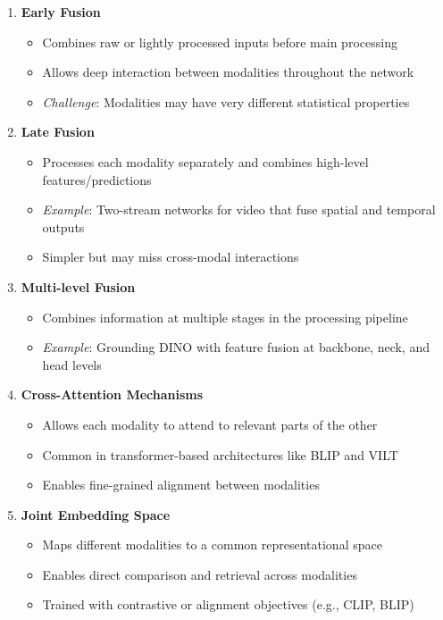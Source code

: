 \begin{enumerate}
    \item \textbf{Early Fusion}
    \begin{itemize}
        \item Combines raw or lightly processed inputs before main processing
        \item Allows deep interaction between modalities throughout the network
        \item \textit{Challenge}: Modalities may have very different statistical properties
    \end{itemize}
    
    \item \textbf{Late Fusion}
    \begin{itemize}
        \item Processes each modality separately and combines high-level features/predictions
        \item \textit{Example}: Two-stream networks for video that fuse spatial and temporal outputs
        \item Simpler but may miss cross-modal interactions
    \end{itemize}

    \item \textbf{Multi-level Fusion}
    \begin{itemize}
        \item Combines information at multiple stages in the processing pipeline
        \item \textit{Example}: Grounding DINO with feature fusion at backbone, neck, and head levels
    \end{itemize}

    \item \textbf{Cross-Attention Mechanisms}
    \begin{itemize}
        \item Allows each modality to attend to relevant parts of the other
        \item Common in transformer-based architectures like BLIP and VILT
        \item Enables fine-grained alignment between modalities
    \end{itemize}

    \item \textbf{Joint Embedding Space}
    \begin{itemize}
        \item Maps different modalities to a common representational space
        \item Enables direct comparison and retrieval across modalities
        \item Trained with contrastive or alignment objectives (e.g., CLIP, BLIP)
    \end{itemize}
\end{enumerate}

